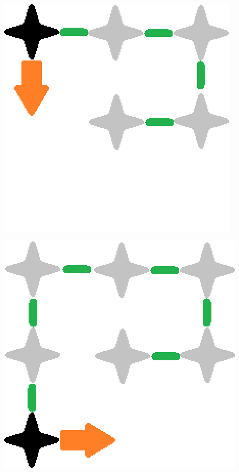 \documentclass{beamer}
\begin{document}
\begin{frame}
\begin{center}
\includegraphics[scale=0.5]{images/s5.PNG}
\end{center}
\end{frame}

\begin{frame}
\begin{center}
\includegraphics[scale=0.5]{images/s6.PNG}
\end{center}
\end{frame}
\end{document}
